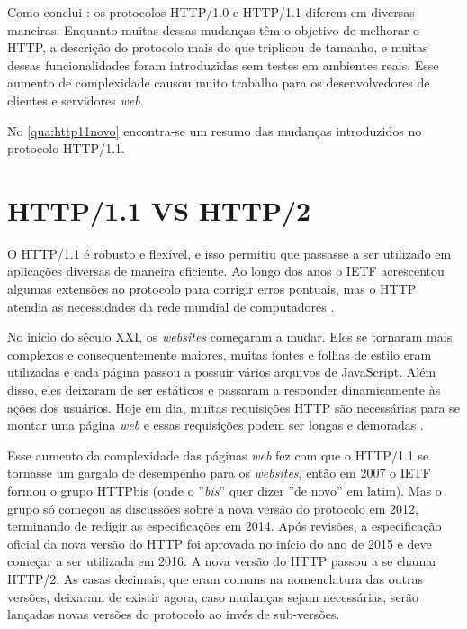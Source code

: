 Como conclui : os protocolos HTTP/1.0 e HTTP/1.1 diferem em diversas maneiras. Enquanto muitas dessas mudanças têm o objetivo de melhorar o HTTP, a descrição do protocolo mais do que triplicou de tamanho, e muitas dessas funcionalidades foram introduzidas sem testes em ambientes reais. Esse aumento de complexidade causou muito trabalho para os desenvolvedores de clientes e servidores \textit{web}. 

No \autoref{qua:http11novo} encontra-se um resumo das mudanças introduzidos no protocolo HTTP/1.1.



\section{HTTP/1.1 VS HTTP/2}
\label{sec:http_11_vs_http_2}

O HTTP/1.1 é robusto e flexível, e isso permitiu que passasse a ser utilizado em aplicações diversas de maneira eficiente. Ao longo dos anos o IETF acrescentou algumas extensões ao protocolo para corrigir erros pontuais, mas o HTTP atendia as necessidades da rede mundial de computadores \cite{Tanenbaum}.

No inicio do século XXI, os \textit{websites} começaram a mudar. Eles se tornaram mais complexos e consequentemente maiores, muitas fontes e folhas de estilo eram utilizadas e cada página passou a possuir vários arquivos de JavaScript. Além disso, eles deixaram de ser estáticos e passaram a responder dinamicamente às ações dos usuários. Hoje em dia, muitas requisições HTTP são necessárias para se montar uma página \textit{web} e essas requisições podem ser longas e demoradas \cite{HighPerformance}.

Esse aumento da complexidade das páginas \textit{web} fez com que o HTTP/1.1 se tornasse um gargalo de desempenho para os \textit{websites}, então em 2007 o IETF formou o grupo HTTPbis (onde o ''\textit{bis}'' quer dizer ''de novo'' em latim). Mas o grupo só começou as discussões sobre a nova versão do protocolo em 2012, terminando de redigir as especificações em 2014. Após revisões, a especificação oficial da nova versão do HTTP foi aprovada no início do ano de 2015 e deve começar a ser utilizada em 2016. A nova versão do HTTP passou a se chamar HTTP/2. As casas decimais, que eram comuns na nomenclatura das outras versões, deixaram de existir agora, caso mudanças sejam necessárias, serão lançadas novas versões do protocolo ao invés de sub-versões.\cite{webPageGrowth}

